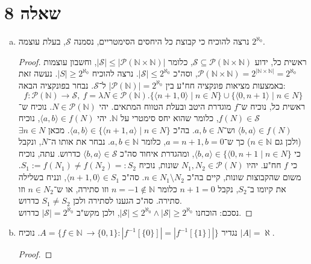 \documentclass[]{article}
\newcommand\N     {\mathbb{N}}
\newcommand\ps    {\mathcal{P}}
\newcommand\sca   {\mathcal{S}} %
\newcommand\ra    {\rangle}
\newcommand\la    {\langle}
\newcommand\al    {\aleph}
\newcommand\taz   {2^{\aleph_0}}
\newcommand\op    {^{-1}}
\begin{document}
	\section*{שאלה 8}
	\begin{enumerate}[(a)]
		\item נרצה להוכיח כי קבוצת כל היחסים הסימטריים, נסמנה $ \sca $, בעלת עוצמה $ \taz $.\begin{proof}
			 ראשית כל, ידוע $ \sca \subseteq \ps(\N \times \N) $, כלומר $ |\sca| \le |\ps(\N \times \N)| $, וחשבון עוצמות $ \ps(\N \times \N) = 2^{|\N \times \N|} = \taz $, וסה"כ $ |\sca| \le \taz $. נרצה להוכיח $ |S| \ge \taz $. נעשה זאת באמצעות מציאות פונקציה חח"ע בין $ |\ps(\N)| = \taz $ ל־$ \sca $. נבחר בפונקציה הבאה: 
			\[ f \colon \ps(\N) \to \sca, \ f = \lambda N \in \ps(\N). \{\la n + 1, 0 \ra \mid n \in N\} \cup \{\la 0, n + 1 \ra \mid n \in N\} \]
			ראשית כל, נוכיח ש־$ f $ מוגדרת היטב ובעלת הטווח המתאים. יהי $ N \in \ps(\N) $. נוכיח ש־$ f(N) \in \sca $, כלומר שהוא יחס סימטרי על $ \N $. יהי $ \la a, b \ra \in f(N) $, נוכיח $ \la b, a \ra \in f(N) $ וש־$ a, b \in N $. בה"כ $ \la a, b \ra \in \{\la n + 1, a \ra \mid n \in N\} $. מכאן $ \exists n \in N $ (ולכן גם $ n \in \N $) כך ש־$ a = n + 1, b = 0 $, כלומר $ a, b \in \N $. נבחר את אותו ה־$ N $, ונקבל כי $ \la b, a \ra \in \{\la 0, n + 1 \mid n \in N\} $, ומהגדרת איחוד סה"כ $ \la b, a \ra \in \sca $ כדרוש. עתה, נוכיח כי $ f $ חח"ע. יהיו $ N_1, N_2 \in \ps(N) $ שונות, נוכיח $ S_1 := f(N_1) \neq f(N_2) =: S_2 $. משום שהקבוצות שונות, קיים בה"כ $ n \in N_1 \setminus N_2 $. סה"כ $ \la n + 1, 0 \ra \in S_1 $, ונניח בשלילה את קיומו ב־$ S_2 $, נקבל $ n+ 1 = 0 $ כלומר $ n = -1 \not\in\N $ וזו סתירה, או ש־$ n \in N_2 $ וזו סתירה. סה"כ הגענו לסתירה ולכן $ S_1 \neq S_2 $ כדרוש. \\
			נסכם: הוכחנו $ |\sca| \le \taz \land |\sca| \ge \taz $, ולכן מקש"ב $ |\sca| = \taz $ כדרוש.
		\end{proof}
		\item נגדיר $ A = \{f \in \N \ \to \{0, 1\} \colon |f\op[\{0\}]| = |f\op[\{1\}]| \} $. נוכיח $ |A| = \al $. \begin{proof}
			

\end{proof}
\end{enumerate}
\end{document}
